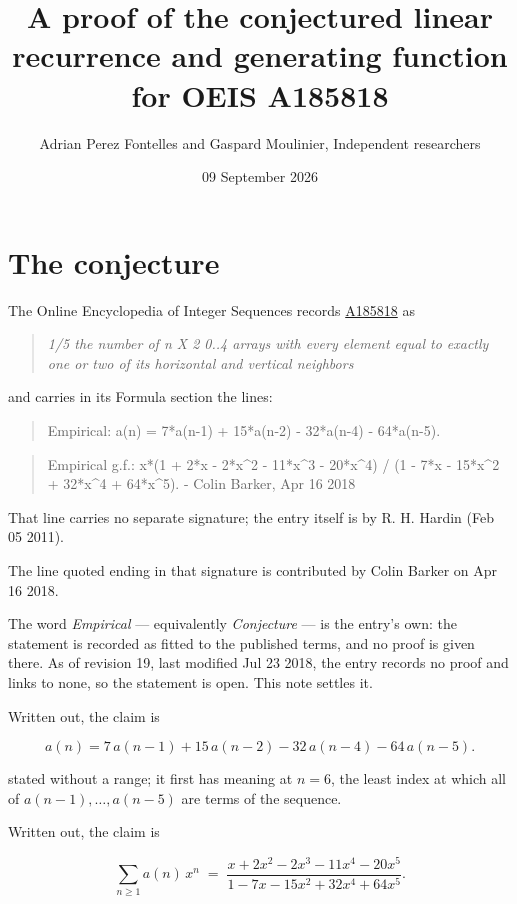 \documentclass[11pt]{article}
\title{A proof of the conjectured linear recurrence and generating function for OEIS A185818}
\author{Adrian Perez Fontelles and Gaspard Moulinier, Independent researchers}
\date{09 September 2026}
\theoremstyle{definition}
\begin{document}
\maketitle
\section{The conjecture}

The Online Encyclopedia of Integer Sequences records \href{https://oeis.org/A185818}{A185818} as

\begin{quote}\itshape 1/5 the number of n X 2 0..4 arrays with every element equal to exactly one or two of its horizontal and vertical neighbors\end{quote}

and carries in its Formula section the lines:

\begin{quote}\ttfamily Empirical: a(n) = 7*a(n-1) + 15*a(n-2) - 32*a(n-4) - 64*a(n-5).\end{quote}

\begin{quote}\ttfamily Empirical g.f.: x*(1 + 2*x - 2*x\textasciicircum{}2 - 11*x\textasciicircum{}3 - 20*x\textasciicircum{}4) / (1 - 7*x - 15*x\textasciicircum{}2 + 32*x\textasciicircum{}4 + 64*x\textasciicircum{}5). - Colin Barker, Apr 16 2018\end{quote}

That line carries no separate signature; the entry itself is by R. H. Hardin (Feb 05 2011).

The line quoted ending in that signature is contributed by Colin Barker on Apr 16 2018.

The word {\itshape Empirical} --- equivalently {\itshape Conjecture} --- is the entry's own: the statement is recorded as fitted to the published terms, and no proof is given there. As of revision 19, last modified Jul 23 2018, the entry records no proof and links to none, so the statement is open. This note settles it.

Written out, the claim is

\[a(n) = 7\,a(n-1) + 15\,a(n-2) - 32\,a(n-4) - 64\,a(n-5).\]

stated without a range; it first has meaning at $n = 6$, the least index at which all of $a(n-1),\dots,a(n-5)$ are terms of the sequence.

Written out, the claim is

\[\sum_{n \ge 1} a(n)\,x^n \;=\; \frac{x + 2x^{2} - 2x^{3} - 11x^{4} - 20x^{5}}{1 - 7x - 15x^{2} + 32x^{4} + 64x^{5}}.\]
\end{document}

